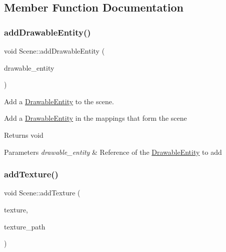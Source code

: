 \subsection{Member Function Documentation}
\mbox{\label{class_scene_ad4f922487ee93dc5bf7c9ca446d05864}} 
\subsubsection{\texorpdfstring{add\+Drawable\+Entity()}{addDrawableEntity()}}
{\footnotesize\ttfamily void Scene\+::add\+Drawable\+Entity (\begin{DoxyParamCaption}\item[{\hyperlink{class_drawable_entity}{Drawable\+Entity} \&}]{drawable\+\_\+entity }\end{DoxyParamCaption})}



Add a \hyperlink{class_drawable_entity}{Drawable\+Entity} to the scene. 

Add a \hyperlink{class_drawable_entity}{Drawable\+Entity} in the mappings that form the scene

\begin{DoxyReturn}{Returns}
void 
\end{DoxyReturn}

\begin{DoxyParams}{Parameters}
{\em drawable\+\_\+entity} & Reference of the \hyperlink{class_drawable_entity}{Drawable\+Entity} to add \\
\hline
\end{DoxyParams}
\mbox{\label{class_scene_ad7c686656e9ad8e20f85f7997c4bc747}} 
\subsubsection{\texorpdfstring{add\+Texture()}{addTexture()}}
{\footnotesize\ttfamily void Scene\+::add\+Texture (\begin{DoxyParamCaption}\item[{sf\+::\+Texture \&}]{texture,  }\item[{const std\+::string}]{texture\+\_\+path }\end{DoxyParamCaption})}



